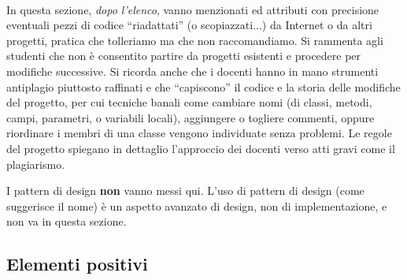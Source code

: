 \documentclass[a4paper,12pt]{report}
\begin{document}
\paragraph{}
\paragraph{}
\paragraph{}
\paragraph{}
\paragraph{}

In questa sezione, \textit{dopo l'elenco},
vanno menzionati ed attributi con precisione eventuali pezzi di codice ``riadattati'' (o scopiazzati...) da Internet o da altri progetti,
pratica che tolleriamo ma che non raccomandiamo.
%
Si rammenta agli studenti che non è consentito partire da progetti esistenti e procedere per modifiche successive.
%
Si ricorda anche che i docenti hanno in mano strumenti antiplagio piuttosto raffinati e che ``capiscono'' il codice e la storia delle modifiche del progetto,
per cui tecniche banali come cambiare nomi (di classi, metodi, campi, parametri, o variabili locali),
aggiungere o togliere commenti,
oppure riordinare i membri di una classe vengono individuate senza problemi.
%
Le regole del progetto spiegano in dettaglio l'approccio dei docenti verso atti gravi come il plagiarismo.

I pattern di design \textbf{non} vanno messi qui.
%
L'uso di pattern di design (come suggerisce il nome) è un aspetto avanzato di design, non di implementazione,
e non va in questa sezione.

\subsection*{Elementi positivi}
\end{document}
